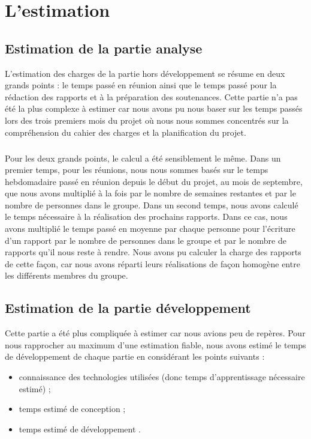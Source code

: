 
\chapter{L'estimation}

\section{Estimation de la partie analyse}

L’estimation des charges de la partie hors développement se résume en deux grands points : le temps passé en réunion ainsi que le temps passé pour la rédaction des rapports et à la préparation des soutenances. Cette partie n’a pas été la plus complexe à estimer car nous avons pu nous baser sur les temps passés lors des trois premiers mois du projet où nous nous sommes concentrés sur la compréhension du cahier des charges et la planification du projet.

\paragraph{}

Pour les deux grands points, le calcul a été sensiblement le même. Dans un premier temps, pour les réunions, nous nous sommes basés sur le temps hebdomadaire passé en réunion depuis le début du projet, au mois de septembre, que nous avons multiplié à la fois par le nombre de semaines restantes et par le nombre de personnes dans le groupe. Dans un  second temps, nous avons calculé le temps nécessaire à la réalisation des prochains rapports. Dans ce cas, nous avons multiplié le temps passé en moyenne par chaque personne pour l’écriture d’un rapport par le nombre de personnes dans le groupe et par le nombre de rapports qu’il nous reste à rendre. Nous avons pu calculer la charge des rapports de cette façon, car nous avons réparti leurs réalisations de façon homogène entre les différents membres du groupe.

\section{Estimation de la partie développement}

Cette partie a été plus compliquée à estimer car nous avions peu de repères. Pour nous rapprocher au maximum d’une estimation fiable, nous avons estimé le temps de développement de chaque partie en considérant les points suivants : 

\begin{itemize}
\item connaissance des technologies utilisées (donc temps d’apprentissage nécessaire estimé) ;
\item temps estimé de conception ;
\item temps estimé de développement .
\end{itemize}

